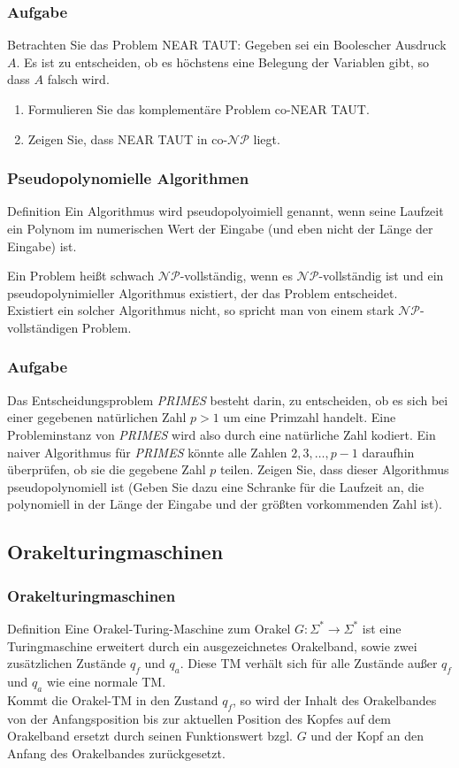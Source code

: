 \documentclass{beamer}
\begin{document}
{\begin{frame}
\frametitle{Aufgabe}
Betrachten Sie das Problem NEAR TAUT: Gegeben sei ein Boolescher Ausdruck $A$. Es ist zu entscheiden, ob es höchstens eine Belegung der Variablen gibt, so dass $A$ falsch wird.
\begin{enumerate}
 \item Formulieren Sie das komplementäre Problem co-NEAR TAUT.
 \item Zeigen Sie, dass NEAR TAUT in co-$\mathcal{NP}$ liegt.
\end{enumerate}
\end{frame}
\begin{frame}
\frametitle{Pseudopolynomielle Algorithmen}
\begin{block}{Definition}
Ein Algorithmus wird pseudopolyoimiell genannt, wenn seine Laufzeit ein Polynom im numerischen Wert der Eingabe (und eben nicht der Länge der Eingabe) ist.
\end{block}
Ein Problem heißt schwach $\mathcal{NP}$-vollständig, wenn es $\mathcal{NP}$-vollständig ist und ein pseudopolynimieller Algorithmus existiert, der das Problem entscheidet.\\
Existiert ein solcher Algorithmus nicht, so spricht man von einem stark $\mathcal{NP}$-vollständigen Problem.
\end{frame}

\begin{frame}
\frametitle{Aufgabe}
Das Entscheidungsproblem \textit{PRIMES} besteht darin, zu entscheiden, ob es sich bei einer gegebenen natürlichen Zahl $p>1$ um eine Primzahl handelt. 
Eine Probleminstanz von \textit{PRIMES} wird also durch eine natürliche Zahl kodiert. 
Ein naiver Algorithmus für \textit{PRIMES} könnte alle Zahlen $2,3,\ldots,p-1$ daraufhin überprüfen, ob sie die gegebene Zahl $p$ teilen. 
Zeigen Sie, dass dieser Algorithmus pseudopolynomiell ist 
(Geben Sie dazu eine Schranke für die Laufzeit an, die polynomiell in der Länge der Eingabe und der größten vorkommenden Zahl ist).
\end{frame}

\subsection{Orakelturingmaschinen}
\begin{frame}
\frametitle{Orakelturingmaschinen}
\begin{block}{Definition}
Eine Orakel-Turing-Maschine zum Orakel $G: \Sigma^* \rightarrow \Sigma^*$ ist eine Turingmaschine erweitert durch ein ausgezeichnetes Orakelband, sowie zwei zusätzlichen Zustände $q_f$ und $q_a$. Diese TM verhält sich für alle Zustände außer $q_f$ und $q_a$ wie eine normale TM.\\
Kommt die Orakel-TM in den Zustand $q_f$, so wird der Inhalt des Orakelbandes von der Anfangsposition bis zur aktuellen Position des Kopfes auf dem Orakelband ersetzt durch seinen Funktionswert bzgl. $G$ und der Kopf an den Anfang des Orakelbandes zurückgesetzt.
\end{block}
\end{frame}

}
\end{document}
